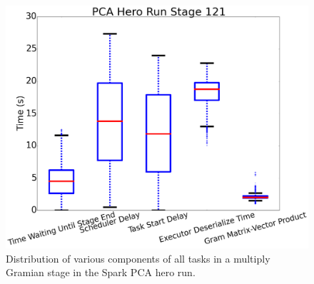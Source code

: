 

\begin{figure}[t]
\centering
\includegraphics[width=.4\textwidth]{fig/pca_box_and_whiskers.png}
\caption{Distribution of various components of all tasks in a multiply Gramian stage in the Spark PCA hero run. }
\label{fig:whisker}
\end{figure}


